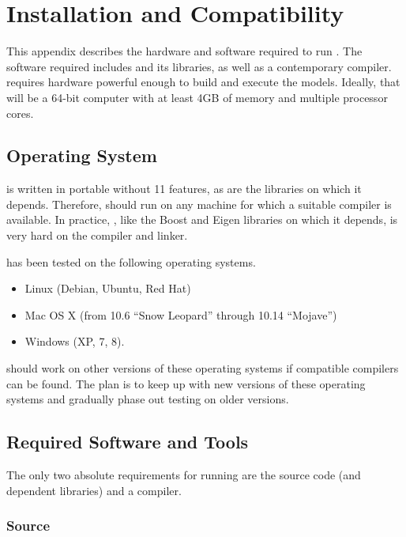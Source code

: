 \chapter{Installation and Compatibility}\label{install.appendix}

\noindent
This appendix describes the hardware and software required to run
\CmdStan.  The software required includes \CmdStan and its libraries,
as well as a contemporary \Cpp compiler.  \CmdStan requires hardware
powerful enough to build and execute the models.  Ideally, that will
be a 64-bit computer with at least 4GB of memory and multiple
processor cores.

\section{Operating System}

\CmdStan is written in portable \Cpp without {\Cpp}11 features, as are the
libraries on which it depends.  Therefore, \CmdStan should run on any machine
for which a suitable \Cpp compiler is available.  In practice, \CmdStan,
like the Boost and Eigen libraries on which it depends, is very hard
on the compiler and linker.

\CmdStan has been tested on the following operating systems.
%
\begin{itemize}
\item Linux (Debian, Ubuntu, Red Hat)
\item Mac OS X (from 10.6 ``Snow Leopard''  through 10.14 ``Mojave'')
\item Windows (XP, 7, 8).
\end{itemize}
%
\CmdStan should work on other versions of these operating systems if
compatible \Cpp compilers can be found.  The plan is to keep up with
new versions of these operating systems and gradually phase out
testing on older versions.

\section{Required Software and Tools}

The only two absolute requirements for running \CmdStan are the
\CmdStan source code (and dependent libraries) and a \Cpp compiler.

\subsection{\CmdStan Source}

